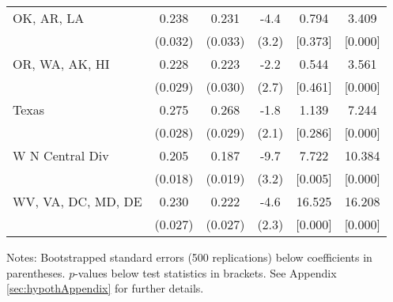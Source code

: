 \begin{landscape}
\begin{table}[ht]
{\begin{threeparttable}
\begin{tabular}{lccccc}
OK, AR, LA & 0.238 & 0.231 & -4.4 & 0.794 & 3.409 \\ 
 & (0.032) & (0.033) & (3.2) & [0.373] & [0.000] \\ 
OR, WA, AK, HI & 0.228 & 0.223 & -2.2 & 0.544 & 3.561 \\ 
 & (0.029) & (0.030) & (2.7) & [0.461] & [0.000] \\ 
Texas & 0.275 & 0.268 & -1.8 & 1.139 & 7.244 \\ 
 & (0.028) & (0.029) & (2.1) & [0.286] & [0.000] \\ 
W N Central Div & 0.205 & 0.187 & -9.7 & 7.722 & 10.384 \\ 
 & (0.018) & (0.019) & (3.2) & [0.005] & [0.000] \\ 
WV, VA, DC, MD, DE & 0.230 & 0.222 & -4.6 & 16.525 & 16.208 \\ 
 & (0.027) & (0.027) & (2.3) & [0.000] & [0.000] \\ 
\bottomrule
\end{tabular}
{\footnotesize {\raggedright Notes: Bootstrapped standard errors (500 replications) below coefficients in parentheses. $p$-values below test statistics in brackets. See Appendix \ref{sec:hypothAppendix} for further details.}}
\end{threeparttable}
}
\end{table}
\end{landscape}

